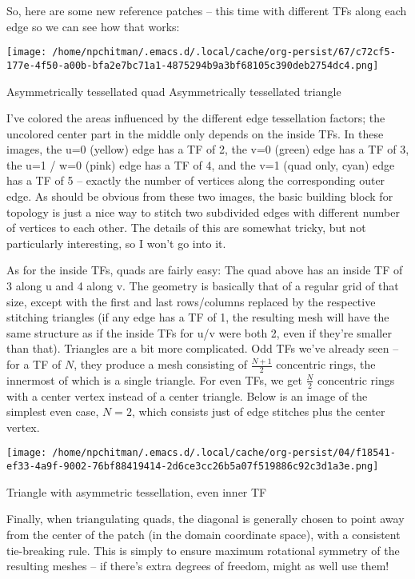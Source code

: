 \documentclass[12pt]{article}
\begin{document}
So, here are some new reference patches – this time with different TFs along each edge so we can see how that works:

\begin{center}
\texttt{[image: /home/npchitman/.emacs.d/.local/cache/org-persist/67/c72cf5-177e-4f50-a00b-bfa2e7bc71a1-4875294b9a3bf68105c390deb2754dc4.png]}
\end{center}
Asymmetrically tessellated quad Asymmetrically tessellated triangle

I’ve colored the areas influenced by the different edge tessellation factors; the uncolored center part in the middle only depends on the inside TFs. In these images, the u=0 (yellow) edge has a TF of 2, the v=0 (green) edge has a TF of 3, the u=1 / w=0 (pink) edge has a TF of 4, and the v=1 (quad only, cyan) edge has a TF of 5 – exactly the number of vertices along the corresponding outer edge. As should be obvious from these two images, the basic building block for topology is just a nice way to stitch two subdivided edges with different number of vertices to each other. The details of this are somewhat tricky, but not particularly interesting, so I won’t go into it.

As for the inside TFs, quads are fairly easy: The quad above has an inside TF of 3 along u and 4 along v. The geometry is basically that of a regular grid of that size, except with the first and last rows/columns replaced by the respective stitching triangles (if any edge has a TF of 1, the resulting mesh will have the same structure as if the inside TFs for u/v were both 2, even if they’re smaller than that). Triangles are a bit more complicated. Odd TFs we’ve already seen – for a TF of \(N\), they produce a mesh consisting of \(\frac{N+1}{2}\) concentric rings, the innermost of which is a single triangle. For even TFs, we get \(\frac{N}{2}\) concentric rings with a center vertex instead of a center triangle. Below is an image of the simplest even case, \(N=2\), which consists just of edge stitches plus the center vertex.

\begin{center}
\texttt{[image: /home/npchitman/.emacs.d/.local/cache/org-persist/04/f18541-ef33-4a9f-9002-76bf88419414-2d6ce3cc26b5a07f519886c92c3d1a3e.png]}
\end{center}
Triangle with asymmetric tessellation, even inner TF

Finally, when triangulating quads, the diagonal is generally chosen to point away from the center of the patch (in the domain coordinate space), with a consistent tie-breaking rule. This is simply to ensure maximum rotational symmetry of the resulting meshes – if there’s extra degrees of freedom, might as well use them!
\end{document}
